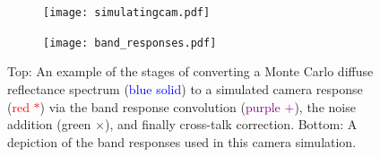 \begin{figure}[h!]
    \centering 
    \begin{subfigure}{0.7\textwidth}
    \centering
        \texttt{[image: simulatingcam.pdf]}
        \caption{}
        \label{fig:simulatingcamsubfigure}
    \end{subfigure}
    \begin{subfigure}{0.62\textwidth}
        \centering
        \texttt{[image: band\_responses.pdf]}
        \caption{}
        \label{fig:bandresponses}
    \end{subfigure}
    \caption{Top: An example of the stages of converting a Monte Carlo diffuse reflectance spectrum (\textcolor{blue}{blue solid}) to a simulated camera response (\textcolor{red}{red $*$}) via the band response convolution (\textcolor{purple}{purple $+$}), the noise addition (\textcolor{MyGreen}{green $\times$}), and finally cross-talk correction. Bottom: A depiction of the band responses used in this camera simulation.}
    \label{fig:simulatingcam}
\end{figure}

